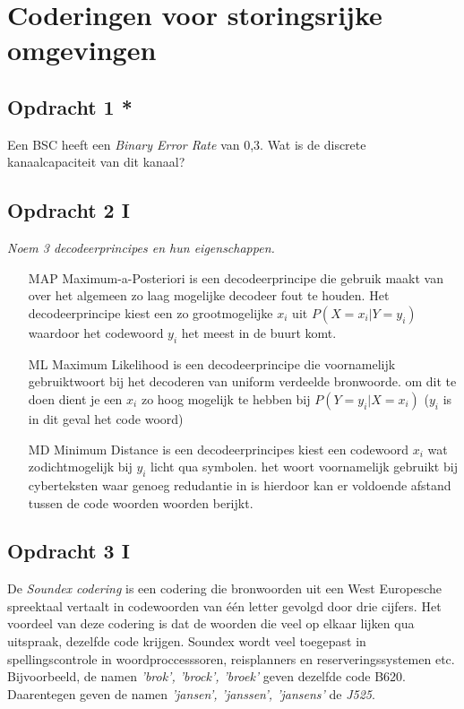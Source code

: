 \chapter{Coderingen voor storingsrijke omgevingen}

\section{Opdracht 1 *}
Een BSC heeft een \emph{Binary Error Rate} van 0,3. Wat is de discrete kanaalcapaciteit van dit kanaal?

\section{Opdracht 2 I}
\emph{Noem 3 decodeerprincipes en hun eigenschappen.}\\

\begin{itemize}
  \item[MAP] Maximum-a-Posteriori is een decodeerprincipe die gebruik maakt van over het algemeen zo laag mogelijke decodeer fout te houden. Het decodeerprincipe kiest een zo grootmogelijke $x_i$ uit $P(X=x_i|Y=y_i)$ waardoor het codewoord $y_i$ het meest in de buurt komt.
  \item[ML] Maximum Likelihood is een decodeerprincipe die voornamelijk gebruiktwoort bij het decoderen van uniform verdeelde bronwoorde. om dit te doen dient je een $x_i$ zo hoog mogelijk te hebben bij $P(Y=y_i|X=x_i)$ ($y_i$ is in dit geval het code woord)
  \item[MD] Minimum Distance is een decodeerprincipes kiest een codewoord $x_i$ wat zodichtmogelijk bij $y_i$ licht qua symbolen. het  woort voornamelijk gebruikt bij cyberteksten waar genoeg redudantie in is hierdoor kan er voldoende afstand tussen de code woorden woorden berijkt.
\end{itemize}

\section{Opdracht 3 I}
De \emph{Soundex codering} is een codering die bronwoorden uit een West Europesche spreektaal vertaalt in codewoorden van \'{e}\'{e}n letter gevolgd door drie cijfers. Het voordeel van deze codering is dat de woorden die veel op elkaar lijken qua uitspraak, dezelfde code krijgen. Soundex wordt veel toegepast in spellingscontrole in woordproccesssoren, reisplanners en reserveringssystemen etc. Bijvoorbeeld, de namen \emph{'brok', 'brock', 'broek'} geven dezelfde code B620. Daarentegen geven de namen \emph{'jansen', 'janssen', 'jansens'} de \emph{J525}.

